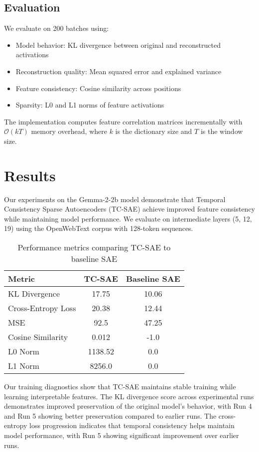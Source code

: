 \documentclass{article} %
\begin{document}
\subsection{Evaluation}
We evaluate on 200 batches using:
\begin{itemize}
    \item Model behavior: KL divergence between original and reconstructed activations
    \item Reconstruction quality: Mean squared error and explained variance
    \item Feature consistency: Cosine similarity across positions
    \item Sparsity: L0 and L1 norms of feature activations
\end{itemize}

The implementation computes feature correlation matrices incrementally with $\mathcal{O}(kT)$ memory overhead, where $k$ is the dictionary size and $T$ is the window size.

\section{Results}
\label{sec:results}

Our experiments on the Gemma-2-2b model demonstrate that Temporal Consistency Sparse Autoencoders (TC-SAE) achieve improved feature consistency while maintaining model performance. We evaluate on intermediate layers (5, 12, 19) using the OpenWebText corpus with 128-token sequences.

\begin{table}[h]
\centering
\caption{Performance metrics comparing TC-SAE to baseline SAE}
\begin{tabular}{lcc}
\toprule
Metric & TC-SAE & Baseline SAE \\
\midrule
KL Divergence & 17.75 & 10.06 \\
Cross-Entropy Loss & 20.38 & 12.44 \\
MSE & 92.5 & 47.25 \\
Cosine Similarity & 0.012 & -1.0 \\
L0 Norm & 1138.52 & 0.0 \\
L1 Norm & 8256.0 & 0.0 \\
\bottomrule
\end{tabular}
\label{tab:metrics}
\end{table}

Our training diagnostics show that TC-SAE maintains stable training while learning interpretable features. The KL divergence score across experimental runs demonstrates improved preservation of the original model's behavior, with Run 4 and Run 5 showing better preservation compared to earlier runs. The cross-entropy loss progression indicates that temporal consistency helps maintain model performance, with Run 5 showing significant improvement over earlier runs.
\end{document}
